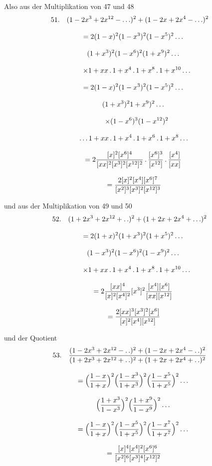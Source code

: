 Also aus der Multiplikation von 47 und 48
\[
\begin{gathered}
51.\quad{}
(1-2x^3+2x^{12}-\mathinner{.\,.\,.})^2+(1-2x+2x^4-\mathinner{.\,.\,.})^2\\[8pt]
\quad=2(1-x)^2(1-x^3)^2(1-x^5)^2\mathinner{.\,.\,.}\\[8pt]\quad{}(1+x^3)^2(1-x^6)^2(1+x^9)^2\mathinner{.\,.\,.}\\[8pt]
\qquad\times1+xx\,.\,1+x^4\,.\,1+x^8\,.\,1+x^{10}\mathinner{.\,.\,.}\\[8pt]
\quad=2(1-x)^2(1-x^3)^2(1-x^5)^2\mathinner{.\,.\,.}\\[8pt]\quad{}(1+x^3)^2 1+x^9)^2\mathinner{.\,.\,.}\\[8pt]
\qquad\times(1-x^6)^3(1-x^{12})^2\\[8pt]\quad{}\mathinner{.\,.\,.} 1+xx\,.\,1+x^4\,.\,1+x^6\,.\,1+x^8\mathinner{.\,.\,.}\\[8pt]
\quad=2\frac{[x]^2[x^6]^4}{[xx]^2[x^3]^2[x^{12}]^2}\,.\,\frac{[x^6]^3}{[x^{12}]}\,.\,\frac{[x^4]}{[xx]}
\\[8pt]\quad{}=\frac{2[x]^2[x^4][x^6]^7}{[x^2]^3[x^3]^2[x^{12}]^3}
\end{gathered}
\]


und aus der Multiplikation von 49 und 50
\[
\begin{gathered}
52.\quad{}
(1+2x^3+2x^{12}+ .\,. )^2+(1+2x+2x^4+\mathinner{.\,.\,.})^2\\[8pt]
\quad=2(1+x)^2(1+x^3)^2(1+x^5)^2\mathinner{.\,.\,.}\\[8pt]\quad{}(1-x^3)^2(1-x^6)^2(1-x^9)^2\mathinner{.\,.\,.}\\[8pt]
\qquad\times1+xx\,.\,1+x^4\,.\,1+x^8\,.\,1+x^{10}\mathinner{.\,.\,.}\\[8pt]
\quad=2\frac{[xx]^4}{[x]^2[x^4]^2}[x^3]^2\frac{[x^4][x^6]}{[xx][x^{12}]}
\\[8pt]\quad{}=\frac{2[xx]^3[x^3]^2[x^6]}{[x]^2[x^4][x^{12}]}
\end{gathered}
\]


und der Quotient
\[
\begin{gathered}
53.\quad{}
\frac{(1-2x^3+2x^{12}- .\,. )^2+(1-2x+2x^4- .\,. )^2}
{(1+2x^3+2x^{12}+ .\,. )^2+(1+2x+2x^4+ .\,. )^2}\\[8pt]
\quad=\Bigl(\frac{1-x}{1+x}\Bigr)^2\Bigl(\frac{1-x^3}{1+x^3}\Bigr)^2\Bigl(\frac{1-x^5}{1+x^5}\Bigr)^2\mathinner{.\,.\,.}
\\[8pt]\quad{}\Bigl(\frac{1+x^3}{1-x^3}\Bigr)^2\Bigl(\frac{1+x^9}{1-x^9}\Bigr)^2\mathinner{.\,.\,.}\\[8pt]
\quad=\Bigl(\frac{1-x}{1+x}\Bigr)^2\Bigl(\frac{1-x^5}{1+x^5}\Bigr)^2\Bigl(\frac{1-x^7}{1+x^7}\Bigr)^2\mathinner{.\,.\,.}
\\[8pt]\quad{}=\frac{[x]^4[x^4]^2[x^6]^6}{[x^2]^6[x^3]^4[x^{12}]^2}
\end{gathered}
\]



